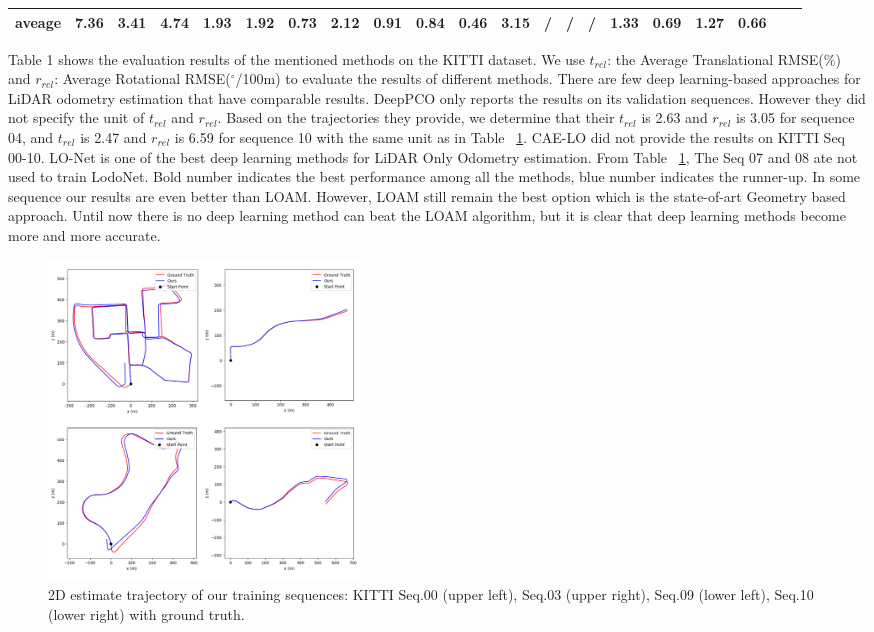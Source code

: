 \documentclass[sigconf]{acmart}
\def\lodo{LodoNet}
\begin{document}
\begin{table}
{\begin{tabular}{|c|cccccccccccccccccc|cc|}
aveage                & 7.36          & 3.41          & 4.74          & 1.93          & 1.92    & 0.73           & 2.12       & 0.91       & \textbf{0.84} & \textbf{0.46} & 3.15           & /              & /            & /            & 1.33            & 0.69     & {\color[HTML]{3166FF} 1.27} & {\color[HTML]{3166FF} 0.66} \\ \hline
\end{tabular}}
\label{tab:results}
\end{table}


Table 1 shows the evaluation results of the mentioned methods on the KITTI dataset. We use $t_{rel}$: the Average Translational RMSE($\%$) and $r_{rel}$: Average Rotational RMSE($^\circ$/100m) to evaluate the results of different methods. There are few deep learning-based approaches for LiDAR odometry estimation that have comparable results. DeepPCO\cite{DeepPCO} only reports the results on its validation sequences. However they did not specify the unit of $t_{rel}$ and $r_{rel}$. Based on the trajectories they provide, we determine that their $t_{rel}$ is 2.63 and $r_{rel}$ is 3.05 for sequence 04, and  $t_{rel}$ is 2.47 and $r_{rel}$ is 6.59 for sequence 10 with the same unit as in Table ~\ref{tab:results}. CAE-LO\cite{CAE-LO} 
did not provide the results on KITTI Seq 00-10. LO-Net\cite{LO-Net} is one of the best deep learning methods for LiDAR Only Odometry estimation. From Table ~\ref{tab:results}, The Seq 07 and 08 ate not used to train \lodo{}. Bold number indicates the best performance among all the methods, blue number indicates the runner-up. In some sequence our results are even better than LOAM. However, LOAM still remain the best option which is the state-of-art Geometry based approach. Until now there is no deep learning method can beat the LOAM algorithm, but it is clear that deep learning methods become more and more accurate. 

\begin{figure}[h]
\setlength{\abovecaptionskip}{-0.1cm} 
\setlength{\belowcaptionskip}{-0.1cm} 
  \centering
  \includegraphics[width=0.4\textwidth]{Figures/train trajectory.png}
  \caption{2D estimate trajectory of our training sequences: KITTI Seq.00 (upper left), Seq.03 (upper right), Seq.09 (lower left), Seq.10 (lower right) with ground truth.}
  \label{fig:train trajectory}
\end{figure}
\end{document}
